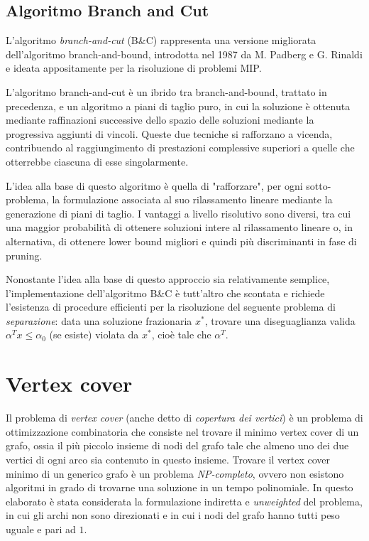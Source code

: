 \subsection{Algoritmo Branch and Cut}
L'algoritmo \textit{branch-and-cut} (B\&C) rappresenta una versione migliorata dell'algoritmo branch-and-bound, introdotta nel 1987
da M. Padberg e G. Rinaldi \cite{PADBERG19871} e ideata appositamente per la risoluzione di problemi MIP. 

L'algoritmo branch-and-cut è un ibrido tra branch-and-bound, trattato in precedenza, e un algoritmo
a piani di taglio puro, in cui la soluzione è ottenuta mediante raffinazioni successive dello spazio delle soluzioni mediante la
progressiva aggiunti di vincoli.
Queste due tecniche si rafforzano a vicenda, contribuendo al raggiungimento di prestazioni complessive superiori a quelle
che otterrebbe ciascuna di esse singolarmente.

L'idea alla base di questo algoritmo è quella di "rafforzare", per ogni sotto-problema, la formulazione associata al suo rilassamento
lineare mediante la generazione di piani di taglio. I vantaggi a livello risolutivo sono diversi, tra cui una maggior probabilità di
ottenere soluzioni intere al rilassamento lineare o, in alternativa, di ottenere lower bound migliori e quindi più discriminanti in 
fase di pruning. 

Nonostante l'idea alla base di questo approccio sia relativamente semplice, l'implementazione dell'algoritmo B\&C è tutt'altro che
scontata e richiede l'esistenza di procedure efficienti per la risoluzione del seguente problema di \textsl{separazione}: data una
soluzione frazionaria {$x^*$}, trovare una diseguaglianza valida $\alpha^Tx\leq \alpha_0$ (se esiste) violata da $x^*$, cioè
tale che $\alpha^T$.

\section{Vertex cover}
Il problema di \textit{vertex cover} (anche detto di \textsl{copertura dei vertici}) è un problema di ottimizzazione combinatoria 
che consiste nel trovare il minimo vertex cover di un grafo, ossia il più piccolo insieme di nodi del grafo tale che almeno uno dei due 
vertici di ogni arco sia contenuto in questo insieme. Trovare il vertex cover minimo di un generico grafo è un problema 
\textsl{NP-completo}, ovvero non esistono algoritmi in grado di trovarne una soluzione in un tempo polinomiale. In questo elaborato è
stata considerata la formulazione indiretta e \textit{unweighted} del problema, in cui gli archi non sono direzionati e in cui i nodi del grafo hanno tutti peso uguale e pari ad $1$.

